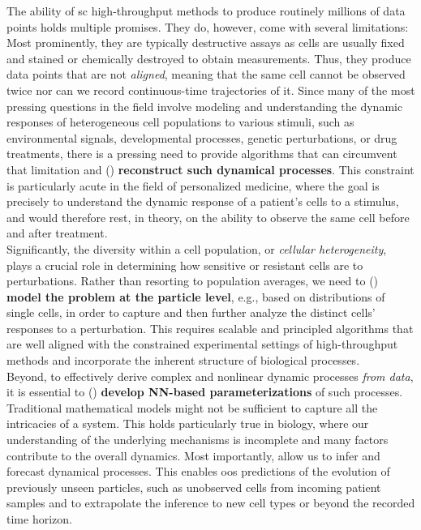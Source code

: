 The ability of \acrlong{sc} high-throughput methods to produce routinely millions of data points holds multiple promises. They do, however, come with several limitations: 
 Most prominently, they are typically destructive assays as cells are usually fixed and stained or chemically destroyed to obtain measurements. Thus, they produce data points that are not \textit{aligned}, meaning that the same cell cannot be observed twice nor can we record continuous-time trajectories of it.
Since many of the most pressing questions in the field involve modeling and understanding the dynamic responses of heterogeneous cell populations to various stimuli, such as environmental signals, developmental processes, genetic perturbations, or drug treatments, there is a pressing need to provide algorithms that can circumvent that limitation and () \textbf{reconstruct such dynamical processes}. 
This constraint is particularly acute in the field of personalized medicine, where the goal is precisely to understand the dynamic response of a patient's cells to a stimulus, and would therefore rest, in theory, on the ability to observe the same cell before and after treatment. \\

Significantly, the diversity within a cell population, or \textit{cellular heterogeneity}, plays a crucial role in determining how sensitive or resistant cells are to perturbations.
Rather than resorting to population averages, we need to () \textbf{model the problem at the particle level}, e.g., based on distributions of single cells, in order to capture and then further analyze the distinct cells' responses to a perturbation. 
This requires scalable and principled algorithms that are well aligned with the constrained experimental settings of high-throughput methods and incorporate the inherent structure of biological processes. \\

Beyond, to effectively derive complex and nonlinear dynamic processes \textit{from data}, it is essential to () \textbf{develop \acrlong{NN}-based parameterizations} of such processes.
Traditional mathematical models might not be sufficient to capture all the intricacies of a system. This holds particularly true in biology, where our understanding of the underlying mechanisms is incomplete and many factors contribute to the overall dynamics.
Most importantly,  allow us to infer and forecast dynamical processes. This enables \acrlong{oos} predictions of the evolution of previously unseen particles, such as unobserved cells from incoming patient samples and to extrapolate the inference to new cell types or beyond the recorded time horizon. \\

